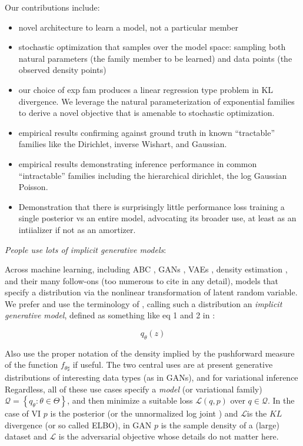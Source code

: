 \documentclass{article}
\begin{document}
Our contributions include:
\begin{itemize}
\item novel architecture to learn a model, not a particular member
\item stochastic optimization that samples over the model space: sampling both natural parameters (the family member to be learned) and data points (the observed density points)
\item our choice of exp fam produces a linear regression type problem in KL divergence.   
 We leverage the natural parameterization of exponential families to derive a novel objective that is amenable to stochastic optimization.
\item empirical results confirming against ground truth in known ``tractable'' families like the Dirichlet, inverse Wishart, and Gaussian.
\item empirical results demonstrating inference performance in common ``intractable'' families including the hierarchical dirichlet, the log Gaussian Poisson.
\item Demonstration that there is surprisingly little performance loss training a single posterior vs an entire model, advocating its broader use, at least as an intiializer if not as an amortizer. 
\end{itemize}


  

  \emph{People use lots of implicit generative models}:
  
  Across machine learning, including ABC \cite{gutmann2014statistical} , GANs \cite{Goodfellow:2014aa}, VAEs \cite{Kingma:2013aa, rezende2014stochastic}, density estimation \cite{papamakarios2017masked}, and their many follow-ons (too numerous to cite in any detail), models that specify a distribution via the nonlinear transformation of latent random variable.  We prefer and use the terminology  of \cite{Mohamed:2016aa}, calling such a distribution an \emph{implicit generative model}, defined as something like eq 1 and 2 in \cite{Mohamed:2016aa}:

   $$  q_\theta (z) $$
   
 Also use the proper notation of the density implied by the pushforward measure of the function $f_{\theta\sharp}$ if useful.   The two central uses are at present generative distributions of interesting data types (as in GANs), and for variational inference
 Regardless, all of these use cases specify a \emph{model} (or variational family) $\mathcal{Q} = \left\{ q_\theta : \theta \in \Theta\right\}$, and then minimize a suitable loss $\mathcal{L}( q , p)$ over $q \in \mathcal{Q}$.   In the case of VI $p$ is the posterior (or the unnormalized log joint ) and $\mathcal{L}$is the $KL$ divergence (or so called ELBO), in GAN $p$ is the sample density of a (large) dataset and $\mathcal{L}$ is the adversarial objective whose details do not matter here.
 
\end{document}
